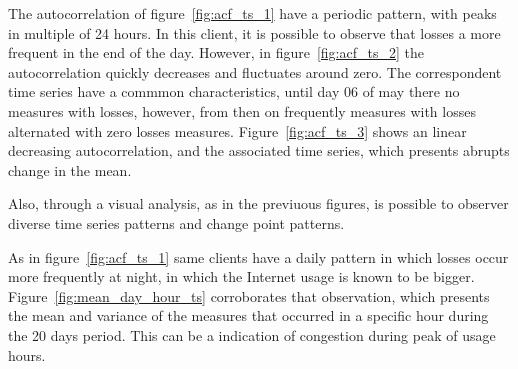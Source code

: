 The autocorrelation of figure~\ref{fig:acf_ts_1} have a periodic pattern, with peaks in multiple of 24 hours. In this client, it is possible to observe that losses a more frequent in the end of the day. However, in figure~\ref{fig:acf_ts_2} the autocorrelation quickly decreases and fluctuates around zero. The correspondent time series have a commmon characteristics, until day 06 of may there no measures with losses, however, from then on frequently measures with losses alternated with zero losses measures. Figure~\ref{fig:acf_ts_3} shows an linear decreasing autocorrelation, and the associated time series, which presents abrupts change in the mean. 

Also, through a visual analysis, as in the previuous figures, is possible to observer diverse time series patterns and change point patterns.

As in figure~\ref{fig:acf_ts_1} same clients have a daily pattern in which losses occur more frequently at night, in which the Internet usage is known to be bigger. Figure~\ref{fig:mean_day_hour_ts} corroborates that observation, which presents the mean and variance of the measures that occurred in a specific hour during the 20 days period. This can be a indication of congestion during peak of usage hours.

